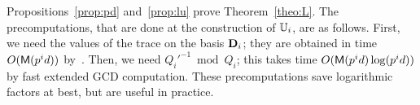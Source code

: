 \smallskip

Propositions~\ref{prop:pd} and~\ref{prop:lu} prove
Theorem~\ref{theo:L}. The precomputations, that are done at the
construction of $\mathbb{U}_i$, are as follows. First, we need the values of
the trace on the basis ${\bf D}_i$; they are obtained in time $O(\mathrm{\sf M}(p^id))$
by~\cite[Prop.~8]{PS06}. Then, we need ${Q_i'}^{-1} \bmod Q_i$; this
takes time $O(\mathrm{\sf M}(p^id) \log(p^id))$ by fast extended GCD
computation.  These precomputations save logarithmic factors at best,
but are useful in practice.


%

